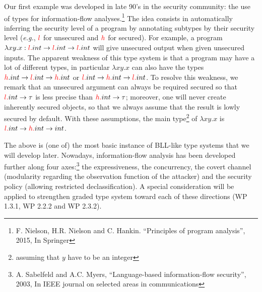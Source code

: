 \documentclass{article}[11pt]
\newcommand\rta{\rightarrow}
\begin{document}
Our first example was developed in late 90's in the security community: the use of types for information-flow analyses.\footnote{F. Nielson, H.R. Nielson and C. Hankin. ``Principles of program analysis'', 2015, In Springer} The idea consists in automatically inferring the security level of a program by annotating subtypes by their security level ({\em e.g.}, ${\color{red} l}$ for unsecured and ${\color{red}h}$ for secured). For example, a program $\lambda xy.x:{\color{red}l.}int\rta {\color{red}l.}int\rta {\color{red}l.}int$ will give unsecured output when given unsecured inputs. %
The apparent weakness of this type system is that a program may have a lot of different types, in particular $\lambda xy.x$ can also have the types ${\color{red}h}.int\rta {\color{red}l.}int\rta {\color{red}h.}int$ or ${\color{red}l.}int\rta {\color{red}h.}int\rta {\color{red}l.}int$. To resolve this weakness, we remark that an unsecured argument can always be required secured so that ${\color{red}l.}int\rta \tau$ is less precise than ${\color{red}h.}int\rta\tau$; moreover, one will never create inherently secured objects, so that we always assume that the result is lowly secured by default. With these assumptions, the main type\footnote{assuming that $y$ have to be an integer} of $\lambda xy.x$ is ${\color{red}l.}int\rta {\color{red}h.}int\rta int$.

The above is (one of) the most basic instance of BLL-like type systems that we will develop later. Nowadays, information-flow analysis has been developed further along four axes:\footnote{A. Sabelfeld and A.C. Myers, ``Language-based information-flow security'', 2003, In IEEE journal on selected areas in communications} the expressiveness, the concurrency, the covert channel (modularity regarding the observation function of the attacker) and the security policy (allowing restricted declassification). A special consideration will be applied to strengthen graded type system toward each of these directions (WP 1.3.1, WP 2.2.2 and WP 2.3.2).

\end{document}
